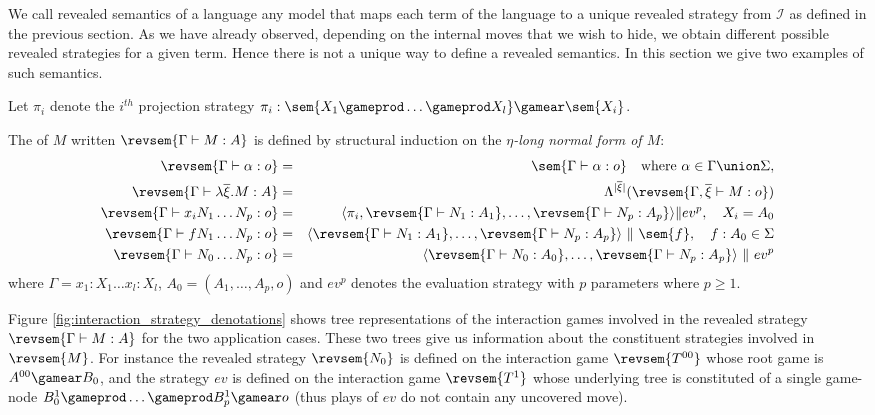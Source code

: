 We call revealed semantics of a language any model that maps each term of the language to a unique revealed strategy from $\mathcal{I}$ as defined in the previous section.
As we have already observed, depending on the internal moves that we wish to hide, we obtain different possible revealed strategies for a given term. Hence there is not a unique way to define a revealed semantics. In this section we give two examples of such semantics.

Let $\pi_i$ denote the $i^{th}$ projection strategy $\pi_i : \sem{X_1 \gameprod
\ldots \gameprod X_l} \gamear \sem{X_i}$.

\begin{definition}
\label{dfn:fully_revealed_semantics}
The  of $M$ written $\revsem{\Gamma \vdash M : A}$ is defined by structural induction on the \emph{$\eta$-long normal form of $M$}:
\begin{eqnarray*}
\revsem{\Gamma \vdash \alpha : o} &=&
\sem{\Gamma \vdash \alpha : o} \quad \mbox{where } \alpha \in \Gamma \union \Sigma,\\
\revsem{\Gamma \vdash \lambda \overline{\xi} . M  : A} &=& \Lambda^{|\overline{\xi}|}(\revsem{\Gamma, \overline{\xi} \vdash M : o })  \\
\revsem{\Gamma  \vdash x_i N_1 \ldots N_p :o} &=& \langle \pi_i, \revsem{\Gamma \vdash N_1 : A_1}, \ldots, \revsem{\Gamma \vdash N_p : A_p}  \rangle \| ev^p, \quad X_i = A_0 \\
\revsem{\Gamma \vdash f N_1 \ldots N_p : o} &=& \langle \revsem{\Gamma \vdash N_1 : A_1}, \ldots, \revsem{\Gamma \vdash N_p : A_p} \rangle\ \|\ \sem{f}, \quad f : A_0 \in \Sigma \\
\revsem{\Gamma \vdash N_0 \ldots N_p : o} &=& \langle \revsem{\Gamma \vdash N_0 : A_0}, \ldots, \revsem{\Gamma \vdash N_p : A_p}  \rangle\ \|\ ev^p
\end{eqnarray*}
where $\Gamma = x_1 : X_1 \ldots x_l : X_l$, $A_0 =
(A_1,\ldots,A_p,o)$ and $ev^p$ denotes the evaluation strategy with
$p$ parameters where $p\geq 1$.
\end{definition}

Figure \ref{fig:interaction_strategy_denotations} shows tree representations of the interaction games involved in the revealed strategy $\revsem{\Gamma \vdash M : A}$ for the two application cases. These two trees give us information about the constituent strategies involved in $\revsem{M}$. For instance the revealed strategy $\revsem{N_0}$ is defined on the interaction game $\revsem{T^{00}}$ whose root game is $A^{00} \gamear B_0$, and the strategy $ev$ is defined on the interaction game $\revsem{T^1}$ whose underlying tree is constituted of a single game-node $B_0^1 \gameprod \ldots \gameprod B_p^1 \gamear o$ (thus plays of $ev$ do not contain any uncovered move).

